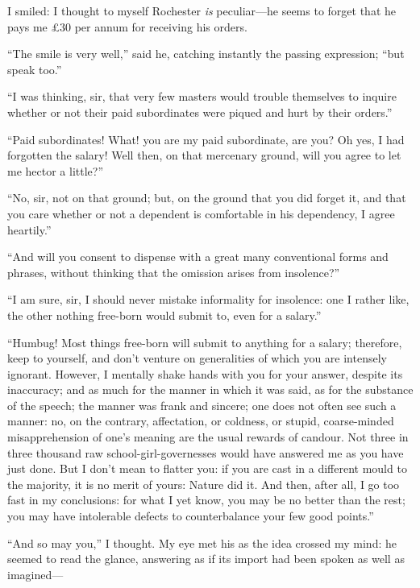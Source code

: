 I smiled: I thought to myself \Mr{} Rochester \emph{is} peculiar---he
seems to forget that he pays me £30 per annum for receiving his orders.

\enquote{The smile is very well,} said he, catching instantly the
passing expression; \enquote{but speak too.}

\enquote{I was thinking, sir, that very few masters would trouble
themselves to inquire whether or not their paid subordinates were piqued
and hurt by their orders.}

\enquote{Paid subordinates! What! you are my paid subordinate, are
you? Oh yes, I had forgotten the salary! Well then, on that mercenary
ground, will you agree to let me hector a little?}

\enquote{No, sir, not on that ground; but, on the ground that you did
forget it, and that you care whether or not a dependent is comfortable
in his dependency, I agree heartily.}

\enquote{And will you consent to dispense with a great many conventional
forms and phrases, without thinking that the omission arises from
insolence?}

\enquote{I am sure, sir, I should never mistake informality for
insolence: one I rather like, the other nothing free-born would submit
to, even for a salary.}

\enquote{Humbug! Most things free-born will submit to anything for a
salary; therefore, keep to yourself, and don't venture on generalities
of which you are intensely ignorant. However, I mentally shake hands
with you for your answer, despite its inaccuracy; and as much for the
manner in which it was said, as for the substance of the speech; the
manner was frank and sincere; one does not often see such a manner: no,
on the contrary, affectation, or coldness, or stupid, coarse-minded
misapprehension of one's meaning are the usual rewards of candour. Not
three in three thousand raw school-girl-governesses would have answered
me as you have just done. But I don't mean to flatter you: if you are
cast in a different mould to the majority, it is no merit of yours:
Nature did it. And then, after all, I go too fast in my conclusions:
for what I yet know, you may be no better than the rest; you may have
intolerable defects to counterbalance your few good points.}

\enquote{And so may you,} I thought. My eye met his as the idea crossed
my mind: he seemed to read the glance, answering as if its import had
been spoken as well as imagined---

